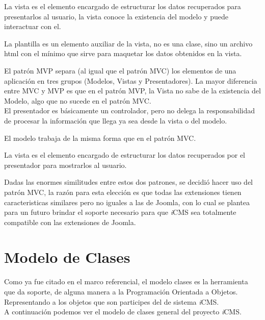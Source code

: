 

La vista es el elemento encargado de estructurar los datos recuperados para presentarlos al usuario, la vista conoce la existencia del modelo y puede interactuar con el.



La plantilla es un elemento auxiliar de la vista, no es una clase, sino un archivo html con el m\'inimo que sirve para maquetar los datos obtenidos en la vista.



El patr\'on MVP separa (al igual que el patr\'on MVC) los elementos de una aplicaci\'on en tres grupos (Modelos, Vistas y Presentadores). La mayor diferencia entre MVC y MVP es que en el patr\'on MVP, la Vista no sabe de la existencia del Modelo, algo que no sucede en el patr\'on MVC.\\

El presentador es b\'asicamente un controlador, pero no delega la responsabilidad de procesar la informaci\'on que llega ya sea desde la vista o del modelo.



El modelo trabaja de la misma forma que en el patr\'on MVC.



La vista es el elemento encargado de estructurar los datos recuperados por el presentador para mostrarlos al usuario.



Dadas las enormes similitudes entre estos dos patrones, se decidi\'o hacer uso del patr\'on MVC, la raz\'on para esta elecci\'on es que todas las extensiones tienen caracteristicas similares pero no iguales a las de Joomla, con lo cual se plantea para un futuro brindar el soporte necesario para que \textit{i}CMS sea totalmente compatible con las extensiones de Joomla.\\

\section{Modelo de Clases}
Como ya fue citado en el marco referencial, el modelo clases es la herramienta que da soporte, de alguna manera a la Programaci\'on Orientada a Objetos. Representando a los objetos que son participes del de sistema \textit{i}CMS.\\
A continuaci\'on podemos ver el modelo de clases general del proyecto \textit{i}CMS.

